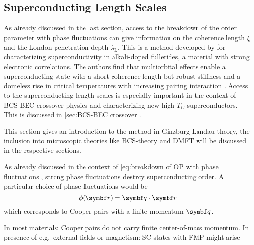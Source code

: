 \documentclass[../notes.tex]{subfiles}
\begin{document}
\subsection*{Superconducting Length Scales}

As already discussed in the last section, access to the breakdown of the order parameter with phase fluctuations can give information on the coherence length \(\xi\) and the London penetration depth \(\lambda_{\mathrm{L}}\).
This is a method developed by \citeauthor{wittBypassingLatticeBCS2024} for characterizing superconductivity in alkali-doped fullerides, a material with strong electronic correlations.
The authors find that multiorbital effects enable a superconducting state with a short coherence length but robust stiffness and a domeless rise in critical temperatures with increasing pairing interaction \cite{wittBypassingLatticeBCS2024}.
Access to the superconducting length scales is especially important in the context of BCS-BEC crossover physics and characterizing new high \(T_C\) superconductors.
This is discussed in \cref{sec:BCS-BEC crossover}.

This section gives an introduction to the method in Ginzburg-Landau theory, the inclusion into microscopic theories like BCS-theory and DMFT will be discussed in the respective sections.

As already discussed in the context of \cref{eq:breakdown of OP with phase fluctuations}, strong phase fluctuations destroy superconducting order.
A particular choice of phase fluctuations would be
\begin{equation}
	\phi (\vb{r}) = \vb{q} \cdot \vb{r}
\end{equation}
which corresponds to Cooper pairs with a finite momentum \(\vb{q}\).

In most materials: Cooper pairs do not carry finite center-of-mass momentum.
In presence of e.g.\ external fields or magnetism: SC states with FMP might arise \cite{chenFiniteMomentumCooper2018, wanOrbitalFuldeFerrell2023, yuanSupercurrentDiodeEffect2022}
\end{document}
